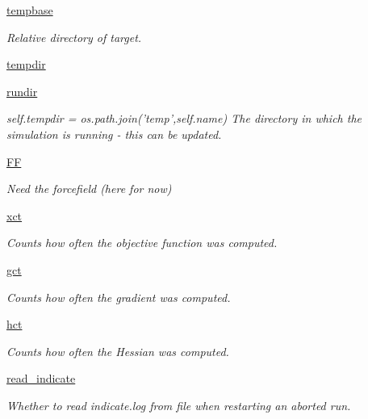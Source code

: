 \begin{DoxyCompactItemize}
\hyperlink{classforcebalance_1_1target_1_1Target_ae5b544d3e11365865813ef3d626ef81d}{tempbase}
\begin{DoxyCompactList}\small\item\em Relative directory of target. \end{DoxyCompactList}\item 
\hyperlink{classforcebalance_1_1target_1_1Target_aa1f01b5b78db253b5b66384ed11ed193}{tempdir}
\item 
\hyperlink{classforcebalance_1_1target_1_1Target_a6872de5b2d4273b82336ea5b0da29c9e}{rundir}
\begin{DoxyCompactList}\small\item\em self.\-tempdir = os.\-path.\-join('temp',self.\-name) The directory in which the simulation is running -\/ this can be updated. \end{DoxyCompactList}\item 
\hyperlink{classforcebalance_1_1target_1_1Target_a38a37919783141ea37fdcf8b00ce0aaf}{F\-F}
\begin{DoxyCompactList}\small\item\em Need the forcefield (here for now) \end{DoxyCompactList}\item 
\hyperlink{classforcebalance_1_1target_1_1Target_aad2e385cfbf7b4a68f1c2cb41133fe82}{xct}
\begin{DoxyCompactList}\small\item\em Counts how often the objective function was computed. \end{DoxyCompactList}\item 
\hyperlink{classforcebalance_1_1target_1_1Target_aa625ac88c6744eb14ef281d9496d0dbb}{gct}
\begin{DoxyCompactList}\small\item\em Counts how often the gradient was computed. \end{DoxyCompactList}\item 
\hyperlink{classforcebalance_1_1target_1_1Target_a5b5a42f78052b47f29ed4b940c6111a1}{hct}
\begin{DoxyCompactList}\small\item\em Counts how often the Hessian was computed. \end{DoxyCompactList}\item 
\hyperlink{classforcebalance_1_1target_1_1Target_aa8af57d5be669c4bb1c0cfd4b7a9220e}{read\-\_\-indicate}
\begin{DoxyCompactList}\small\item\em Whether to read indicate.\-log from file when restarting an aborted run. \end{DoxyCompactList}\item 

\end{DoxyCompactItemize}
